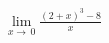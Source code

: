\documentclass[preview]{standalone}
\begin{document}
\begin{align*}
\lim\limits_{x\to\,0} \frac{(2+x)^3 - 8}{x}
\end{align*}
\end{document}
